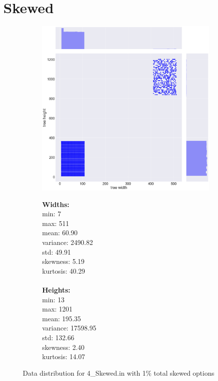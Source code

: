 \section{Skewed}
\begin{figure}[H]
\centering
\begin{subfigure}{.8\textwidth}
	\includegraphics[width=.9\textwidth]{img/4_SKEWED_plot.png}
\end{subfigure}%
\begin{subfigure}{.2\textwidth}
  \centering
  \begin{minipage}{1\textwidth}
\textbf{Widths:}
\\
min: 7
\\
max: 511
\\
mean: 60.90
\\
variance: 2490.82
\\
std: 49.91
\\
skewness: 5.19
\\
kurtosis: 40.29
\\\\
\textbf{Heights:}
\\
min: 13
\\
max: 1201
\\
mean: 195.35
\\
variance: 17598.95
\\
std: 132.66
\\
skewness: 2.40
\\
kurtosis: 14.07
  \end{minipage}
\end{subfigure}
\caption{Data distribution for 4\_Skewed.in with 1\% total skewed options}
\label{appendix:data:skewed}
\end{figure}
